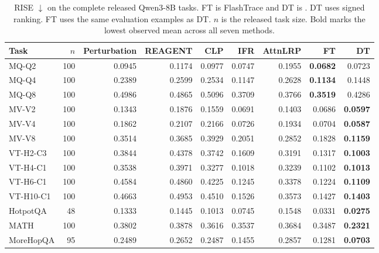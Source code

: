 \begin{table}[t]
\centering\small
\caption{RISE $\downarrow$ on the complete released Qwen3-8B tasks. FT is FlashTrace \citep{pan2026flashtrace} and DT is \dt{}. DT uses signed ranking. FT uses the same evaluation examples as DT. $n$ is the released task size. Bold marks the lowest observed mean across all seven methods.}
\label{tab:full}
\setlength{\tabcolsep}{3.0pt}
\begin{tabular}{@{}lr rrrrrrr@{}}
\toprule
Task & $n$ & Perturbation & REAGENT & CLP & IFR & AttnLRP & FT & DT \\
\midrule
MQ-Q2 & 100 & 0.0945 & 0.1174 & 0.0977 & 0.0747 & 0.1955 & \textbf{0.0682} & 0.0723 \\
MQ-Q4 & 100 & 0.2389 & 0.2599 & 0.2534 & 0.1147 & 0.2628 & \textbf{0.1134} & 0.1448 \\
MQ-Q8 & 100 & 0.4986 & 0.4865 & 0.5096 & 0.3709 & 0.3766 & \textbf{0.3519} & 0.4286 \\
MV-V2 & 100 & 0.1343 & 0.1876 & 0.1559 & 0.0691 & 0.1403 & 0.0686 & \textbf{0.0597} \\
MV-V4 & 100 & 0.1862 & 0.2107 & 0.2166 & 0.0726 & 0.1934 & 0.0704 & \textbf{0.0587} \\
MV-V8 & 100 & 0.3514 & 0.3685 & 0.3929 & 0.2051 & 0.2852 & 0.1828 & \textbf{0.1159} \\
\midrule
VT-H2-C3 & 100 & 0.3844 & 0.4378 & 0.3742 & 0.1609 & 0.3191 & 0.1317 & \textbf{0.1003} \\
VT-H4-C1 & 100 & 0.3538 & 0.3971 & 0.3277 & 0.1018 & 0.3239 & 0.1102 & \textbf{0.1013} \\
VT-H6-C1 & 100 & 0.4584 & 0.4860 & 0.4225 & 0.1245 & 0.3378 & 0.1224 & \textbf{0.1109} \\
VT-H10-C1 & 100 & 0.4663 & 0.4953 & 0.4510 & 0.1526 & 0.3573 & 0.1427 & \textbf{0.1403} \\
\midrule
HotpotQA & 48 & 0.1333 & 0.1445 & 0.1013 & 0.0745 & 0.1548 & 0.0331 & \textbf{0.0275} \\
MATH & 100 & 0.3802 & 0.3878 & 0.3616 & 0.3537 & 0.3684 & 0.3487 & \textbf{0.2321} \\
MoreHopQA & 95 & 0.2489 & 0.2652 & 0.2487 & 0.1455 & 0.2857 & 0.1281 & \textbf{0.0703} \\
\bottomrule
\end{tabular}
\end{table}

